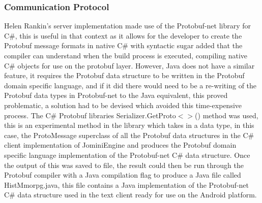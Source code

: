 \documentclass{article}
\begin{document}
\subsubsection{Communication Protocol}

Helen Rankin's server implementation made use of the Protobuf-net library for C\#, this is useful in that context as it allows for the developer to create the Protobuf message formats in native C\# with syntactic sugar added that the compiler can understand when the build process is executed, compiling native C\# objects for use on the protobuf layer. However, Java does not have a similar feature, it requires the Protobuf data structure to be written in the Protobuf domain specific language, and if it did there would need to be a re-writing of the Protobuf data types in Protobuf-net to the Java equivalent, this proved problematic, a solution had to be devised which avoided this time-expensive process. The C\# Protobuf libraries Serializer.GetProto$<>$() method was used, this is an experimental method in the library which takes in a data type, in this case, the ProtoMessage superclass of all the Protobuf data structures in the C\# client implementation of JominiEngine and produces the Protobuf domain specific language implementation of the Protobuf-net C\# data structure. Once the output of this was saved to file, the result could then be run through the Protobuf compiler with a Java compilation flag to produce a Java file called HistMmorpg.java, this file contains a Java implementation of the Protobuf-net C\# data structure used in the text client ready for use on the Android platform.
\end{document}

